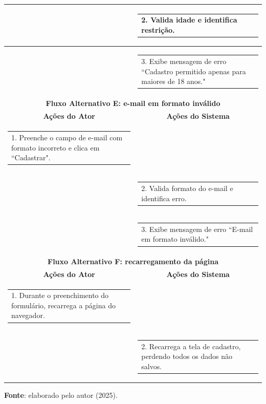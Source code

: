 \begin{longtable}[c]{|p{}|p{}|}
   \\ \hline
\multicolumn{1}{|p{0.48\textwidth}|}{} &
  \begin{tabular}[c]{@{}p{}@{}}2. Valida idade e identifica restrição.\end{tabular} \\ \hline
\multicolumn{1}{|p{0.48\textwidth}|}{} &
  \begin{tabular}[c]{@{}p{}@{}}3. Exibe mensagem de erro ``Cadastro permitido apenas para maiores de 18 anos."\end{tabular} \\ \hline
\multicolumn{2}{|c|}{\textbf{Fluxo Alternativo E: e-mail em formato inválido}} \\ \hline
\multicolumn{1}{|c|}{\textbf{Ações do Ator}} &
  \multicolumn{1}{c|}{\textbf{Ações do Sistema}} \\ \hline
\multicolumn{1}{|p{0.48\textwidth}|}{\begin{tabular}[c]{@{}p{}@{}}1. Preenche o campo de e-mail com formato incorreto e clica em ``Cadastrar".\end{tabular}} &
   \\ \hline
\multicolumn{1}{|p{0.48\textwidth}|}{} &
  \begin{tabular}[c]{@{}p{}@{}}2. Valida formato do e-mail e identifica erro.\end{tabular} \\ \hline
\multicolumn{1}{|p{0.48\textwidth}|}{} &
  \begin{tabular}[c]{@{}p{}@{}}3. Exibe mensagem de erro ``E-mail em formato inválido."\end{tabular} \\ \hline
\multicolumn{2}{|c|}{\textbf{Fluxo Alternativo F: recarregamento da página}} \\ \hline
\multicolumn{1}{|c|}{\textbf{Ações do Ator}} &
  \multicolumn{1}{c|}{\textbf{Ações do Sistema}} \\ \hline
\multicolumn{1}{|p{0.48\textwidth}|}{\begin{tabular}[c]{@{}p{}@{}}1. Durante o preenchimento do formulário, recarrega a página do navegador.\end{tabular}} &
   \\ \hline
\multicolumn{1}{|p{0.48\textwidth}|}{} &
  \begin{tabular}[c]{@{}p{}@{}}2. Recarrega a tela de cadastro, perdendo todos os dados não salvos.\end{tabular} \\ \hline
\end{longtable}
\begin{center}
    \small{\textbf{Fonte}: elaborado pelo autor (2025).}
\end{center}


